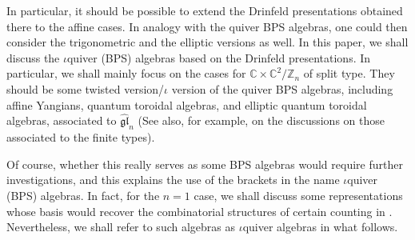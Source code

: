 \documentclass[11pt]{article}
\numberwithin{equation}{section}
\numberwithin{figure}{section}
\numberwithin{table}{section}
\begin{document}
In particular, it should be possible to extend the Drinfeld presentations obtained there to the affine cases. In analogy with the quiver BPS algebras, one could then consider the trigonometric and the elliptic versions as well. In this paper, we shall discuss the $\iota$quiver (BPS) algebras based on the Drinfeld presentations. In particular, we shall mainly focus on the cases for $\mathbb{C}\times\mathbb{C}^2/\mathbb{Z}_n$ of split type. They should be some twisted version/$\iota$ version of the quiver BPS algebras, including affine Yangians, quantum toroidal algebras, and elliptic quantum toroidal algebras, associated to $\widehat{\mathfrak{gl}}_n$ (See also, for example, \cite{Gavshin:2025akn,Galakhov:2026cwv,Galakhov:2026hdx} on the discussions on those associated to the finite types).

Of course, whether this really serves as some BPS algebras would require further investigations, and this explains the use of the brackets in the name $\iota$quiver (BPS) algebras. In fact, for the $n=1$ case, we shall discuss some representations whose basis would recover the combinatorial structures of certain counting in \cite{Kac:1999av}. Nevertheless, we shall refer to such algebras as $\iota$quiver algebras in what follows.
\end{document}
